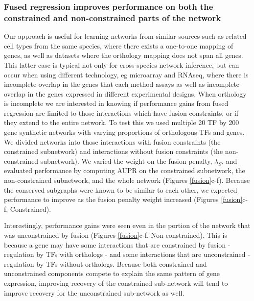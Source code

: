 \documentclass[11pt]{article}
\begin{document}
\subsubsection{Fused regression improves performance on both the constrained and non-constrained parts of the network}
Our approach is useful for learning networks from similar sources such as related cell types from the same species, where there exists a one-to-one mapping of genes, as well as datasets where the orthology mapping does not span all genes. This latter case is typical not only for cross-species network inference, but can occur when using different technology, eg microarray and RNAseq, where there is incomplete overlap in the genes that each method assays as well as incomplete overlap in the genes expressed in different experimental designs. When orthology is incomplete we are interested in knowing if performance gains from fused regression are limited to those interactions which have fusion constraints, or if they extend to the entire network. To test this we used multiple 20 TF by 200 gene synthetic networks with varying proportions of orthologous TFs and genes. We divided networks into those interactions with fusion constraints (the constrained subnetwork) and interactions without fusion constraints (the non-constrained subnetwork). 
We varied the weight on the fusion penalty, $\lambda_S$, and evaluated performance by computing AUPR on the constrained subnetwork, the non-constrained subnetwork, and the whole network (Figures \ref{fusion}c-f). Because the conserved subgraphs were known to be similar to each other, we expected performance to improve as the fusion penalty weight increased (Figures \ref{fusion}c-f, Constrained).

Interestingly, performance gains were seen even in the portion of the network that was unconstrained by fusion (Figures \ref{fusion}c-f, Non-constrained). This is because a gene may have some interactions that are constrained by fusion - regulation by TFs with orthologs - and some interactions that are unconstrained - regulation by TFs without orthologs. Because both constrained and unconstrained components compete to explain the same pattern of gene expression, improving recovery of the constrained sub-network will tend to improve recovery for the unconstrained sub-network as well.
\end{document}
